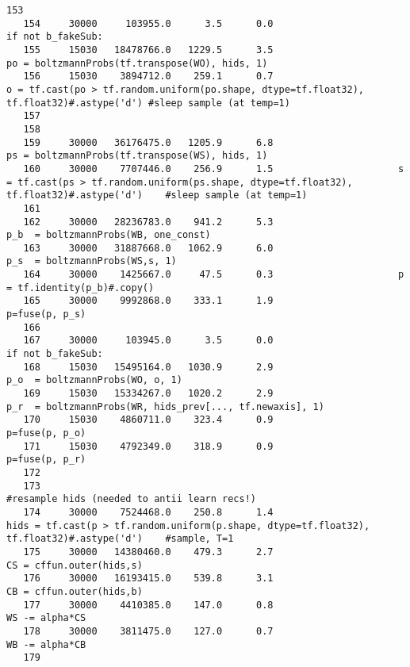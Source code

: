 \begin{lstlisting}[xrightmargin=0.05\linewidth,caption=Line by line profiling of the learnWeights\#learn function (boltzmann probs as an eager function), label=profiling:line_learn]
   153                                           
   154     30000     103955.0      3.5      0.0                      if not b_fakeSub:
   155     15030   18478766.0   1229.5      3.5                          po = boltzmannProbs(tf.transpose(WO), hids, 1)
   156     15030    3894712.0    259.1      0.7                          o = tf.cast(po > tf.random.uniform(po.shape, dtype=tf.float32), tf.float32)#.astype('d') #sleep sample (at temp=1)
   157                                                                   
   158                                           
   159     30000   36176475.0   1205.9      6.8                      ps = boltzmannProbs(tf.transpose(WS), hids, 1)
   160     30000    7707446.0    256.9      1.5                      s = tf.cast(ps > tf.random.uniform(ps.shape, dtype=tf.float32), tf.float32)#.astype('d')    #sleep sample (at temp=1)
   161                                           
   162     30000   28236783.0    941.2      5.3                      p_b  = boltzmannProbs(WB, one_const)
   163     30000   31887668.0   1062.9      6.0                      p_s  = boltzmannProbs(WS,s, 1)
   164     30000    1425667.0     47.5      0.3                      p = tf.identity(p_b)#.copy()
   165     30000    9992868.0    333.1      1.9                      p=fuse(p, p_s)
   166                                           
   167     30000     103945.0      3.5      0.0                      if not b_fakeSub:
   168     15030   15495164.0   1030.9      2.9                          p_o  = boltzmannProbs(WO, o, 1)
   169     15030   15334267.0   1020.2      2.9                          p_r  = boltzmannProbs(WR, hids_prev[..., tf.newaxis], 1)
   170     15030    4860711.0    323.4      0.9                          p=fuse(p, p_o)
   171     15030    4792349.0    318.9      0.9                          p=fuse(p, p_r)
   172                                           
   173                                                               #resample hids (needed to antii learn recs!)
   174     30000    7524468.0    250.8      1.4                      hids = tf.cast(p > tf.random.uniform(p.shape, dtype=tf.float32), tf.float32)#.astype('d')    #sample, T=1
   175     30000   14380460.0    479.3      2.7                      CS = cffun.outer(hids,s)
   176     30000   16193415.0    539.8      3.1                      CB = cffun.outer(hids,b)
   177     30000    4410385.0    147.0      0.8                      WS -= alpha*CS
   178     30000    3811475.0    127.0      0.7                      WB -= alpha*CB
   179                                           

\end{lstlisting}
